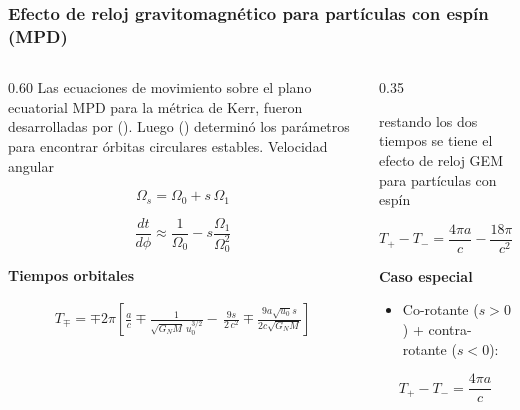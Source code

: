 \documentclass[aspectratio=169,10pt,usenames,dvipsnames,spanish]{beamer}
\begin{document}
\begin{frame}
\frametitle{Efecto de reloj gravitomagnético para partículas con espín (MPD)}

\begin{columns}[t]

\begin{column}{0.60\textwidth}
Las ecuaciones de movimiento sobre el plano ecuatorial MPD para la métrica de Kerr, fueron desarrolladas por (\cite{Saijo1998}). Luego (\cite{Jefremov2015}) determinó los parámetros para encontrar órbitas circulares estables. Velocidad angular

\begin{equation}
\Omega_s = \Omega_0 + s\,\Omega_1
\end{equation}

\begin{equation}
\frac{dt}{d\phi} \approx \frac{1}{\Omega_0} - s\frac{\Omega_1}{\Omega_0^2}
\end{equation}

\textbf{Tiempos orbitales}

\begin{align}
T_{\mp}=\mp 2\pi\left[\frac{a}{c}\mp \frac{1}{\sqrt{G_NM}\,u_0^{3/2}}-\,\frac{9s}{2\,c^2}\mp \frac{9a\sqrt{u_0}s}{2c\sqrt{G_NM}}\right]
\end{align}

\end{column}

\begin{column}{0.35\textwidth}

restando los dos tiempos se tiene el efecto de reloj GEM para partículas con espín

\begin{equation}
T_+ - T_- = \frac{4\pi a}{c} - \frac{18\pi s}{c^2}
\end{equation}

\textbf{Caso especial}

\begin{itemize}
\item Co-rotante ($s>0$) + contra-rotante ($s<0$):
\end{itemize}

\begin{equation}
T_+ - T_- = \frac{4\pi a}{c}
\end{equation}


\end{column}

\end{columns}

\end{frame}
\end{document}

